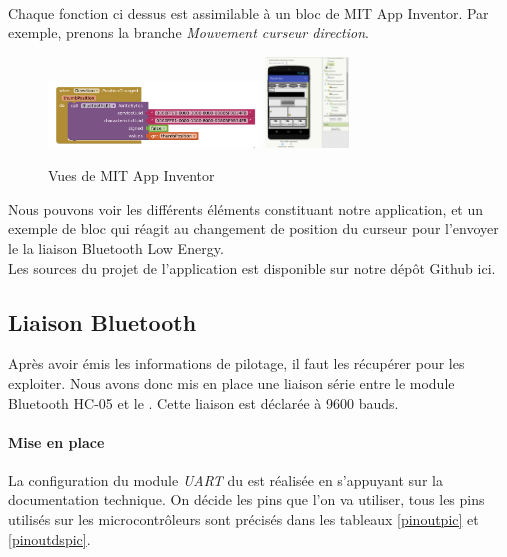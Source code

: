 		\\Chaque fonction ci dessus est assimilable à un bloc de MIT App Inventor. Par exemple, prenons la branche \textit{Mouvement curseur direction}.
		\begin{figure}
			\begin{center}		
				\includegraphics[width=0.5\textwidth]{../Illus/MITBlock.png}
				\includegraphics[width=0.2\textwidth]{../Illus/MITScreen.png}
			\end{center}
			\caption{Vues de MIT App Inventor}
		\end{figure}
		Nous pouvons voir les différents éléments constituant notre application, et un exemple de bloc qui réagit au changement de position du curseur pour l'envoyer le la liaison Bluetooth Low Energy.
		\\Les sources du projet de l'application est disponible sur notre dépôt Github ici\cite{git}.
			\subsection{Liaison Bluetooth}
			Après avoir émis les informations de pilotage, il faut les récupérer pour les exploiter. Nous avons donc mis en place une liaison série entre le module Bluetooth HC-05 et le \pic. Cette liaison est déclarée à 9600 bauds.
			\paragraph{Mise en place}La configuration du module \textit{UART} du \pic est réalisée en s'appuyant sur la documentation technique\cite{DatasheetPIC}. On décide les pins que l'on va utiliser, tous les pins utilisés sur les microcontrôleurs sont précisés dans les tableaux \ref{pinoutpic} et \ref{pinoutdspic}.
			
			
